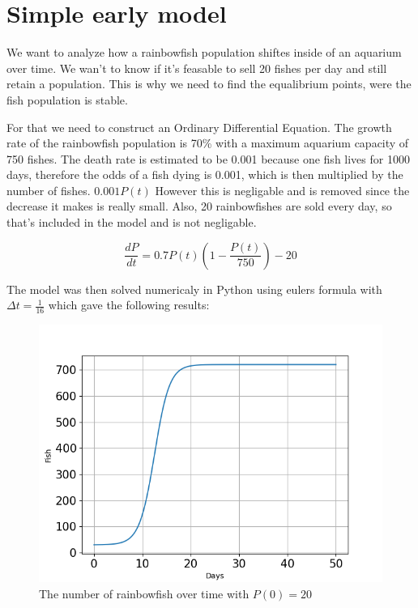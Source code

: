 \section{Simple early model}

\begin{flushleft}
    We want to analyze how a rainbowfish population shiftes inside
    of an aquarium over time. We wan't to know if it's feasable to
    sell 20 fishes per day and still retain a population. This is why
    we need to find the equalibrium points, were the fish population is
    stable.
\end{flushleft}


\begin{flushleft}
    For that we need to construct an Ordinary Differential Equation.
    The growth rate of the rainbowfish population is 70\% with
    a maximum aquarium capacity of 750 fishes. The death rate is
    estimated to be 0.001 because one fish lives for 1000
    days, therefore the odds of a fish dying is 0.001, which is then
    multiplied by the number of fishes. $0.001P(t)$
    However this is negligable and is
    removed since the decrease it makes is really small.
    Also, 20 rainbowfishes are sold every day,
    so that's included in the model and is not negligable.
\end{flushleft}

\begin{equation}
    \frac{dP}{dt} = 0.7P(t)(1-\frac{P(t)}{750})-20
\end{equation}

\begin{flushleft}

    The model was then solved numericaly in Python using
    eulers formula with $\Delta t=\frac{1}{16}$
    which gave the following results:

\end{flushleft}

\begin{figure}[H]
    \centering
    \includegraphics[scale=0.4]{../figures/Figure_1.png}
    \caption{The number of rainbowfish over time with $P(0)=20$}
\end{figure}

